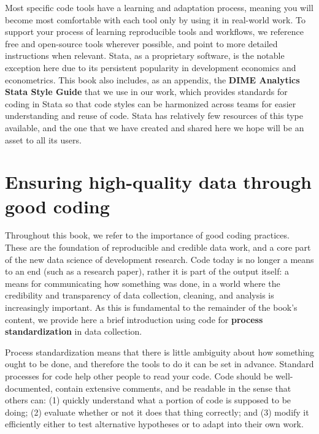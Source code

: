 Most specific code tools have a learning and adaptation process,
meaning you will become most comfortable with each tool
only by using it in real-world work.
To support your process of learning reproducible tools and workflows,
we reference free and open-source tools wherever possible,
and point to more detailed instructions when relevant.
Stata, as a proprietary software, is the notable exception here
due to its persistent popularity in development economics and econometrics.
This book also includes, as an appendix,
the \textbf{DIME Analytics Stata Style Guide}
that we use in our work, which provides
standards for coding in Stata so that code styles
can be harmonized across teams for easier understanding and reuse of code.
Stata has relatively few resources of this type available,
and the one that we have created and shared here
we hope will be an asset to all its users.


\section{Ensuring high-quality data through good coding}

Throughout this book, we refer to the importance of good coding practices.
These are the foundation of reproducible and credible data work,
and a core part of the new data science of development research.
Code today is no longer a means to an end (such as a research paper),
rather it is part of the output itself: a means for communicating how something was done,
in a world where the credibility and transparency of data collection, cleaning, and analysis is increasingly important.
As this is fundamental to the remainder of the book's content,
we provide here a brief introduction using code for \textbf{process standardization} in data collection.

Process standardization means that there is
little ambiguity about how something ought to be done,
and therefore the tools to do it can be set in advance.
Standard processes for code help other people to read your code.
Code should be well-documented, contain extensive comments, and be readable in the sense that others can:
(1) quickly understand what a portion of code is supposed to be doing;
(2) evaluate whether or not it does that thing correctly; and
(3) modify it efficiently either to test alternative hypotheses
or to adapt into their own work.

